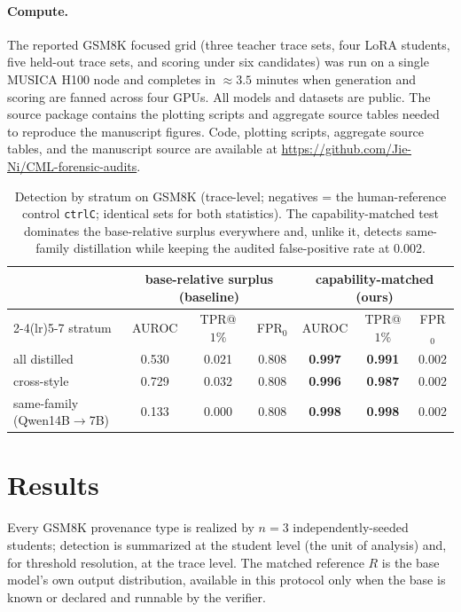 \documentclass[journal]{IEEEtran}
\begin{document}
\paragraph{Compute.}
The reported GSM8K focused grid (three teacher trace sets, four LoRA students, five
held-out trace sets, and scoring under six candidates) was run on a single MUSICA
H100 node and completes in
$\approx\!3.5$ minutes when generation and scoring are fanned across four GPUs. All models and
datasets are public. The source package contains the plotting scripts and aggregate
source tables needed to reproduce the manuscript figures. Code, plotting scripts,
aggregate source tables, and the manuscript source are available at
\url{https://github.com/Jie-Ni/CML-forensic-audits}.

\begin{table}[t]\centering\small
\caption{Detection by stratum on GSM8K (trace-level; negatives = the human-reference control \texttt{ctrlC}; identical sets for both statistics). The capability-matched test dominates the base-relative surplus everywhere and, unlike it, detects same-family distillation while keeping the audited false-positive rate at 0.002.}\label{tab:detection}
\begin{tabular}{lcccccc}\toprule
& \multicolumn{3}{c}{base-relative surplus (baseline)} & \multicolumn{3}{c}{\textbf{capability-matched (ours)}} \\
\cmidrule(lr){2-4}\cmidrule(lr){5-7}
stratum & AUROC & TPR@$1\%$ & FPR$_0$ & AUROC & TPR@$1\%$ & FPR$_0$ \\\midrule
all distilled & 0.530 & 0.021 & 0.808 & \textbf{0.997} & \textbf{0.991} & 0.002 \\
cross-style & 0.729 & 0.032 & 0.808 & \textbf{0.996} & \textbf{0.987} & 0.002 \\
same-family (Qwen14B$\to$7B) & 0.133 & 0.000 & 0.808 & \textbf{0.998} & \textbf{0.998} & 0.002 \\
\bottomrule\end{tabular}\end{table}

\section{Results}
\label{sec:results}
Every GSM8K provenance type is realized by $n=3$ independently-seeded students;
detection is summarized at the student level (the unit of analysis) and, for
threshold resolution, at the trace level. The matched reference $R$ is the base
model's own output distribution, available in this protocol only when the base is
known or declared and runnable by the verifier.
\end{document}
